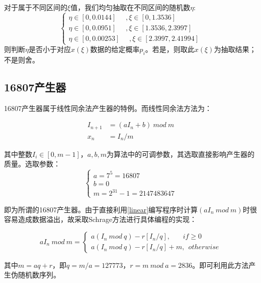 \documentclass[a4paper,11pt]{article}
\begin{document}
对于属于不同区间的$\xi$值，我们均匀抽取在不同区间的随机数$\eta$:
\begin{equation}
\left\{
\begin{array}{l}
 \eta \in [0,0.0144]~~~~~~,\xi \in [0,1.3536]  \\
 \eta \in [0,0.0951] ~~~~~~,\xi \in [1.3536,2.3997]  \\
 \eta \in [0,0.00253] ~~~~~~,\xi \in [2.3997,2.41994]
\end{array}
\right.
\end{equation}
则判断$\eta$是否小于对应$x(\xi)$数据的给定概率$p_{i}$。若是，则取此$x(\xi)$为抽取结果；不是则舍。


\subsection{16807产生器}
16807产生器属于线性同余法产生器的特例。而线性同余法方法为：

\begin{equation}
\begin{aligned}
	I_{n+1} &= (aI_{n} + b) \ mod \ m \\
	x_{n} &= I_{n}/m
\end{aligned}
\label{linear}	
\end{equation}

其中整数$I_{i} \in [0,m-1]$，$a,b,m$为算法中的可调参数，其选取直接影响产生器的质量。选取参数：
\begin{equation}
\left\{
\begin{array}{l}
	a = 7^{5} = 16807 \\
	b = 0 \\
	m = 2^{31}-1 = 2147483647
\end{array}
\right.
\end{equation}

即为所谓的16807产生器。由于直接利用\ref{linear}编写程序时计算$(aI_{n} \ mod \ m )$时很容易造成数据溢出，故采取Schrage方法进行具体编程的实现：

\begin{equation}
	aI_{n} \ mod \ m = \left\{
	\begin{array}{l}
		a(I_{n}\ mod \ q) - r[I_{n}/q],\ \ \ \ \ \ \ \ if \geq 0 \\
		a(I_{n}\ mod \ q) - r[I_{n}/q] + m,\ \ otherwise	
			\end{array}
	\right.
\end{equation}

其中$m=aq+r$，即$q=m/a=127773$，$r=m \ mod \ a=2836$。即可利用此方法产生伪随机数序列。
\end{document}
